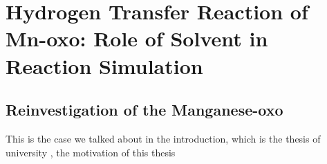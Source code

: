 
\chapter{Hydrogen Transfer Reaction of Mn-oxo: Role of Solvent in Reaction
Simulation\label{chpt:mnoxo}}


\section{Reinvestigation of the Manganese-oxo }

This is the case we talked about in the introduction, which is the
thesis of university , the motivation of this thesis
